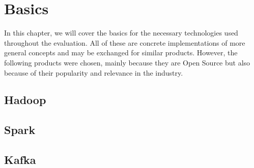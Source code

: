 
\chapter{Basics}

In this chapter, we will cover the basics for the necessary technologies used throughout the evaluation. All of these are concrete implementations of more general concepts and may be exchanged for similar products. However, the following products were chosen, mainly because they are Open Source
but also because of their popularity and relevance in the industry.



\section{Hadoop}
\section{Spark}
\section{Kafka}
